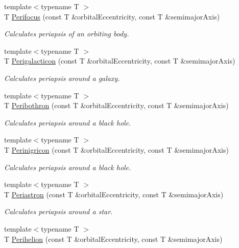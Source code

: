 \begin{DoxyCompactItemize}
{\footnotesize template$<$typename T $>$ }\\T \hyperlink{group___periapsis_gaff62669fb364a245cb85f9a91d8ea71f}{Perifocus} (const T \&orbital\+Eccentricity, const T \&semimajor\+Axis)
\begin{DoxyCompactList}\small\item\em Calculates periapsis of an orbiting body. \end{DoxyCompactList}\item 
{\footnotesize template$<$typename T $>$ }\\T \hyperlink{group___periapsis_ga074fecab96b90bebffa512a37e52d90b}{Perigalacticon} (const T \&orbital\+Eccentricity, const T \&semimajor\+Axis)
\begin{DoxyCompactList}\small\item\em Calculates periapsis around a galaxy. \end{DoxyCompactList}\item 
{\footnotesize template$<$typename T $>$ }\\T \hyperlink{group___periapsis_gada5892309279a3a687c4eb2f88238e4e}{Peribothron} (const T \&orbital\+Eccentricity, const T \&semimajor\+Axis)
\begin{DoxyCompactList}\small\item\em Calculates periapsis around a black hole. \end{DoxyCompactList}\item 
{\footnotesize template$<$typename T $>$ }\\T \hyperlink{group___periapsis_ga99d86af90179994e17158b082c502fd4}{Perinigricon} (const T \&orbital\+Eccentricity, const T \&semimajor\+Axis)
\begin{DoxyCompactList}\small\item\em Calculates periapsis around a black hole. \end{DoxyCompactList}\item 
{\footnotesize template$<$typename T $>$ }\\T \hyperlink{group___periapsis_ga477de6824cbb5986cdae923141e21648}{Periastron} (const T \&orbital\+Eccentricity, const T \&semimajor\+Axis)
\begin{DoxyCompactList}\small\item\em Calculates periapsis around a star. \end{DoxyCompactList}\item 
{\footnotesize template$<$typename T $>$ }\\T \hyperlink{group___periapsis_ga941d285e3a0b48ada9c9f60925ff63c2}{Perihelion} (const T \&orbital\+Eccentricity, const T \&semimajor\+Axis)

\end{DoxyCompactItemize}
